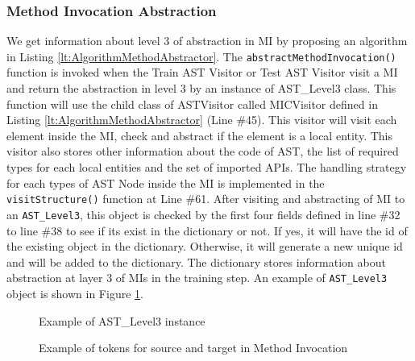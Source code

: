 \subsubsection{Method Invocation Abstraction}
We get information about level 3 of abstraction in MI by proposing an algorithm in Listing \ref{lt:AlgorithmMethodAbstractor}. The \texttt{abstractMethodInvocation()} function is invoked when the Train AST Visitor or Test AST Visitor visit a MI and return the abstraction in level 3 by an instance of AST\_Level3 class. This function will use the child class of ASTVisitor called MICVisitor defined in Listing \ref{lt:AlgorithmMethodAbstractor} (Line \#45). This visitor will visit each element inside the MI, check and abstract if the element is a local entity. This visitor also stores other information about the code of AST, the list of required types for each local entities and the set of imported APIs. The handling strategy for each types of AST Node inside the MI is implemented in the \texttt{visitStructure()} function at Line \#61. After visiting and abstracting of MI to an \texttt{AST\_Level3}, this object is checked by the first four fields defined in line \#32 to line \#38 to see if its exist in the dictionary or not. If yes, it will have the id of the existing object in the dictionary. Otherwise, it will generate a new unique id and will be added to the dictionary. The dictionary stores information about abstraction at layer 3 of MIs in the training step. An example of  \texttt{AST\_Level3} object is shown in Figure \ref{fig:mapping_expression}.

\begin{figure}[]
        \caption{\label{fig:mapping_expression} Example of AST\_Level3 instance}
      \end{figure}



\begin{figure}[]
        \caption{\label{fig:method_desc_example} Example of tokens for source and target in Method Invocation}
      \end{figure}


